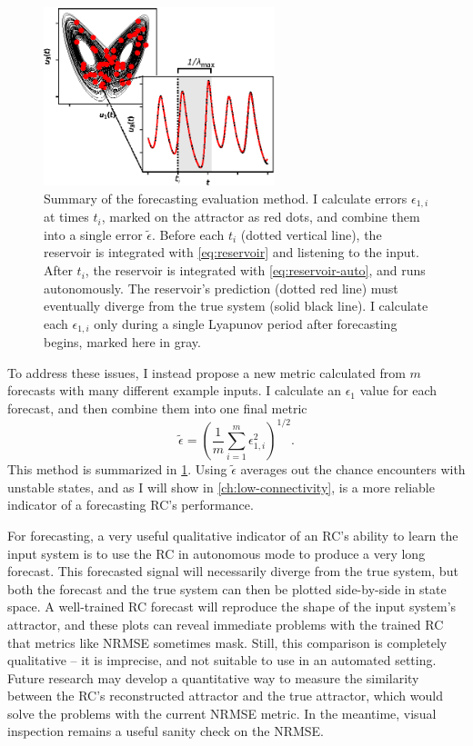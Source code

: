 \begin{figure}
  \includegraphics[width=0.6\textwidth]{figures/nrmse-avg}
  \caption{Summary of the forecasting evaluation method. I calculate
    errors $\epsilon_{1,i}$ at times $t_i$, marked on the attractor as
    red dots, and combine them into a single error
    $\tilde{\epsilon}$. Before each $t_i$ (dotted vertical line), the
    reservoir is integrated with \cref{eq:reservoir} and listening to
    the input. After $t_i$, the reservoir is integrated with
    \cref{eq:reservoir-auto}, and runs autonomously. The reservoir's
    prediction (dotted red line) must eventually diverge from the true
    system (solid black line). I calculate each $\epsilon_{1,i}$ only
    during a single Lyapunov period after forecasting begins, marked
    here in gray.}%
  \label{fig:nrmse-avg}
\end{figure}

To address these issues, I instead propose a new metric calculated from
$m$ forecasts with many different example inputs. I calculate an
$\epsilon_1$ value for each forecast, and then combine them into one
final metric
\begin{equation}
  \label{eq:nrmse-avg}
  \tilde{\epsilon} = {\left( \frac{1}{m} \sum_{i=1}^m \epsilon_{1,i}^2 \right)}^{1/2}.
\end{equation}
This method is summarized in \cref{fig:nrmse-avg}.
Using $\tilde{\epsilon}$ averages out the chance encounters with
unstable states, and as I will show in \cref{ch:low-connectivity}, is
a more reliable indicator of a forecasting RC's performance.

For forecasting, a very useful qualitative indicator of an RC's ability
to learn the input system is to use the RC in autonomous mode to
produce a very long forecast. This forecasted signal will necessarily
diverge from the true system, but both the forecast and the true
system can then be plotted side-by-side in state space. A well-trained
RC forecast will reproduce the shape of the input system's attractor,
and these plots can reveal immediate problems with the trained RC that
metrics like NRMSE sometimes mask. Still, this comparison is
completely qualitative -- it is imprecise, and not suitable to use in
an automated setting. Future research may develop a quantitative way
to measure the similarity between the RC's reconstructed attractor and
the true attractor, which would solve the problems with the current
NRMSE metric. In the meantime, visual inspection remains a useful
sanity check on the NRMSE.

